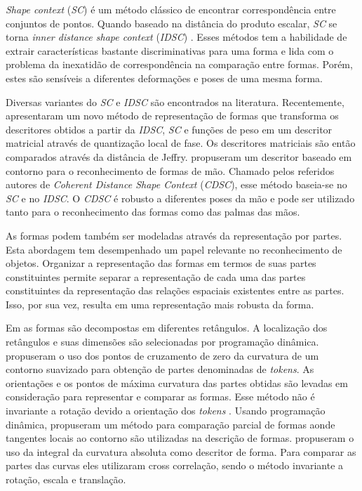 \textit{Shape context} (\textit{SC}) \cite{Belongie:2002} é um método clássico de encontrar correspondência entre conjuntos de pontos. Quando baseado na distância do produto escalar, \textit{SC} se torna \textit{inner distance shape context} (\textit{IDSC}) \cite{1467513}. Esses métodos tem a habilidade de extrair características bastante discriminativas para uma forma e lida com o problema da inexatidão de correspondência na comparação entre formas. Porém, estes são sensíveis a diferentes deformações e poses de uma mesma forma.

Diversas variantes do \textit{SC} e \textit{IDSC} são encontrados na literatura. Recentemente,  apresentaram um novo método de representação de formas que transforma os descritores obtidos a partir da \textit{IDSC}, \textit{SC} e funções de peso em um descritor matricial através de quantização local de fase. Os descritores matriciais são então comparados através da distância de Jeffry.  propuseram um descritor baseado em contorno para o reconhecimento de formas de mão. Chamado pelos referidos autores de \textit{Coherent Distance Shape Context} (\textit{CDSC}), esse método baseia-se no \textit{SC} e no \textit{IDSC}. O \textit{CDSC} é robusto a diferentes poses da mão e pode ser utilizado tanto para o reconhecimento das formas como das palmas das mãos.  

As formas podem também ser modeladas através da representação por partes. Esta abordagem tem desempenhado um papel relevante no reconhecimento de objetos. Organizar a representação das formas em termos de suas partes constituintes permite separar a representação de cada uma das partes constituintes da representação das relações espaciais existentes entre as partes. Isso, por sua vez, resulta em uma representação mais robusta da forma. 

Em \cite{Kenji:1992} as formas são decompostas em diferentes retângulos. A localização dos retângulos e suas dimensões são selecionadas por programação dinâmica.  propuseram o uso dos pontos de cruzamento de zero da curvatura de um contorno suavizado para obtenção de partes denominadas de \textit{tokens}. As orientações e os pontos de máxima curvatura das partes obtidas são levadas em consideração para representar e comparar as formas. Esse método não é invariante a rotação devido a orientação dos \textit{tokens} \cite{DiRuberto:2009}. Usando programação dinâmica,  propuseram um método para comparação parcial de formas aonde tangentes locais ao contorno são utilizadas na descrição de formas.  propuseram o uso da integral da curvatura absoluta como descritor de forma. Para comparar as partes das curvas eles utilizaram cross correlação, sendo o método invariante a rotação, escala e translação.  

